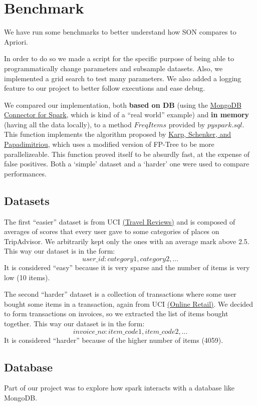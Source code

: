 \documentclass[a4paper]{article}
\begin{document}
	\section{Benchmark}
	We have run some benchmarks to better understand how SON compares to Apriori.
	
	In order to do so we made a script for the specific purpose of being able to programmatically change parameters and 	subsample datasets.
	Also, we implemented a grid search to test many parameters. We also added a logging feature to our project to better follow executions and ease debug.
	
	We compared our implementation, both \textbf{based on DB} (using the \href{https://www.mongodb.com/docs/spark-connector/current/}{MongoDB Connector for Spark}, which is kind of a ``real world'' example) and \textbf{in memory} (having all the data locally), to a method $FreqItems$ provided by $pyspark.sql$. 
	This function implements the algorithm proposed by \href{https://doi.org/10.1145/762471.762473}{Karp, Schenker, and Papadimitriou}, which uses a modified version of FP-Tree to be more parallelizeable. This function proved itself to be absurdly fast, at the expense of false positives.
	Both a  `simple' dataset and a `harder' one were used to compare performances.

	\subsection{Datasets}
	The first ``easier'' dataset is from UCI \href{https://archive.ics.uci.edu/ml/datasets/Travel+Reviews#}{(Travel Reviews)} and is composed of averages of scores that every user gave to some
	categories of places on TripAdvisor. We arbitrarily kept only the ones with an average mark above 2.5. This way our dataset is in the form:
	\[ user\_id: category1, category2, \ldots \]
	It is considered ``easy'' because it is very sparse and the number of items is very low (10 items).

	The second ``harder'' dataset is a collection of transactions where some user bought some items in a transaction, again from UCI \href{https://archive.ics.uci.edu/ml/datasets/online+retail}{(Online Retail)}.
	We decided to form transactions on invoices, so we extracted the list of items bought together.
	This way our dataset is in the form:
	\[ invoice\_no: item\_code1, item\_code2, \ldots \]
	It is considered ``harder'' because of the higher number of items (4059).

	\subsection{Database}
	Part of our project was to explore how spark interacts with a database like MongoDB.
	
\end{document}
